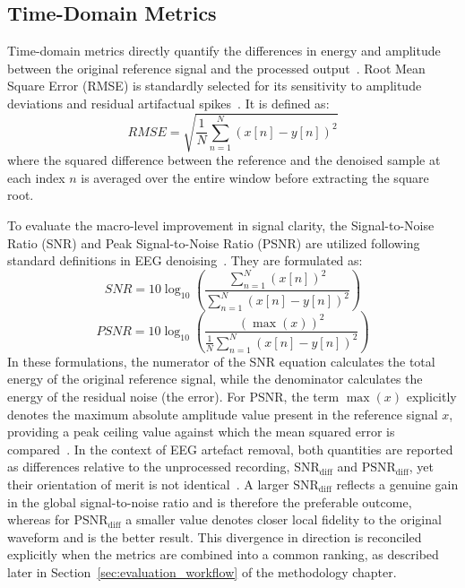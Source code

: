 \documentclass[MScCS,12pt,oneside,final]{uccthesis}
\begin{document}
        \subsection{Time-Domain Metrics}
        \label{subsec:time_domain_metrics}
        
        Time-domain metrics directly quantify the differences in energy and amplitude between the original reference signal and the processed output~\parencite{sweeney2012artifact}. Root Mean Square Error (RMSE) is standardly selected for its sensitivity to amplitude deviations and residual artifactual spikes~\parencite{longo2026framework}. It is defined as:
        \begin{equation}
            RMSE = \sqrt{\frac{1}{N} \sum_{n=1}^{N} \left(x[n] - y[n]\right)^2}
        \label{eq:rmse}
        \end{equation}
        where the squared difference between the reference and the denoised sample at each index $n$ is averaged over the entire window before extracting the square root.
        
        To evaluate the macro-level improvement in signal clarity, the Signal-to-Noise Ratio (SNR) and Peak Signal-to-Noise Ratio (PSNR) are utilized following standard definitions in EEG denoising~\parencite{chen2014eeg, longo2026framework}. They are formulated as:
        \begin{equation}
            SNR = 10 \log_{10} \left( \frac{\sum_{n=1}^{N} (x[n])^2}{\sum_{n=1}^{N} (x[n] - y[n])^2} \right)
        \label{eq:snr}
        \end{equation}
        \begin{equation}
            PSNR = 10 \log_{10} \left( \frac{(\max(x))^2}{\frac{1}{N} \sum_{n=1}^{N} (x[n] - y[n])^2} \right)
        \label{eq:psnr}
        \end{equation}
        In these formulations, the numerator of the SNR equation calculates the total energy of the original reference signal, while the denominator calculates the energy of the residual noise (the error). For PSNR, the term $\max(x)$ explicitly denotes the maximum absolute amplitude value present in the reference signal $x$, providing a peak ceiling value against which the mean squared error is compared~\parencite{chen2014eeg}. In the context of EEG artefact removal, both quantities are reported as differences relative to the unprocessed recording, $\mathrm{SNR}_{\mathrm{diff}}$ and $\mathrm{PSNR}_{\mathrm{diff}}$, yet their orientation of merit is not identical~\parencite{uriguen2015eeg}. A larger $\mathrm{SNR}_{\mathrm{diff}}$ reflects a genuine gain in the global signal-to-noise ratio and is therefore the preferable outcome, whereas for $\mathrm{PSNR}_{\mathrm{diff}}$ a smaller value denotes closer local fidelity to the original waveform and is the better result. This divergence in direction is reconciled explicitly when the metrics are combined into a common ranking, as described later in Section~\ref{sec:evaluation_workflow} of the methodology chapter.
\end{document}
